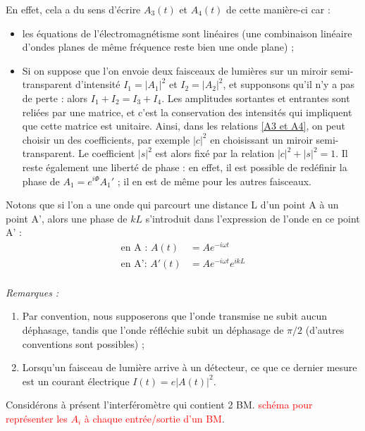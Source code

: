 \documentclass[../notesdecours.tex]{subfiles}
\begin{document}
En effet, cela a du sens d'écrire $A_3(t)$ et $A_4(t)$ de cette manière-ci car : \begin{itemize}[label = \textbullet]
    \item les équations de l'électromagnétisme sont linéaires (une combinaison linéaire d'ondes planes de même fréquence reste bien une onde plane) ; 
    \item Si on suppose que l'on envoie deux faisceaux de lumières sur un miroir semi-transparent d'intensité $I_1 = \left| A_1 \right|^2$ et $I_2 = \left| A_2 \right|^2$, et supponsons qu'il n'y a pas de perte : alors $I_1 + I_2 = I_3 + I_4$. Les amplitudes sortantes et entrantes sont reliées par une matrice, et c'est la conservation des intensités qui impliquent que cette matrice est unitaire. Ainsi, dans les relations \eqref{A3 et A4}, on peut choisir un des coefficients, par exemple $\left| c \right|^2$ en choisissant un miroir semi-transparent. Le coefficient $\left| s \right|^2$ est alors fixé par la relation $\left| c \right|^2 + \left| s \right|^2 = 1$. 
    \newline Il reste également une liberté de phase : en effet, il est possible de redéfinir la phase de $A_1 = e^{i\Phi} A_1'$ ; il en est de même pour les autres faisceaux. 
\end{itemize}

Notons que si l'on a une onde qui parcourt une distance L d'un point A à un point A', alors une phase de $kL$ s'introduit dans l'expression de l'onde en ce point A' : 
\begin{align}
    \mbox{en A : } A(t)&= Ae^{-i\omega t} \\
    \mbox{en A': } A'(t)&= A e^{-i\omega t} e^{ikL}
\end{align}\label{dephasage} \\

\textit{Remarques :} 
\begin{enumerate}
    \item Par convention, nous supposerons que l'onde transmise ne subit aucun déphasage, tandis que l'onde réfléchie subit un déphasage de $\pi /2$ (d'autres conventions sont possibles) ; 
    \item Lorsqu'un faisceau de lumière arrive à un détecteur, ce que ce dernier mesure est un courant électrique $I(t) = e \left| A(t) \right|^2$. 
\end{enumerate}

Considérons à présent l'interféromètre qui contient 2 BM. \textcolor{red}{schéma pour représenter les $A_i$ à chaque entrée/sortie d'un BM}. 
\end{document}
